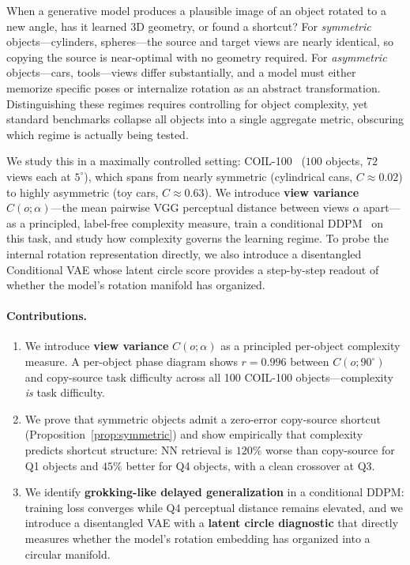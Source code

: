 \documentclass[11pt]{article}
\begin{document}
When a generative model produces a plausible image of an object rotated to a
new angle, has it learned 3D geometry, or found a shortcut?  For
\emph{symmetric} objects---cylinders, spheres---the source and target views are
nearly identical, so copying the source is near-optimal with no geometry
required.  For \emph{asymmetric} objects---cars, tools---views differ
substantially, and a model must either memorize specific poses or internalize
rotation as an abstract transformation.  Distinguishing these regimes requires
controlling for object complexity, yet standard benchmarks collapse all objects
into a single aggregate metric, obscuring which regime is actually being tested.

We study this in a maximally controlled setting: COIL-100~\cite{nene1996coil}
($100$ objects, $72$ views each at $5^{\circ}$), which spans from nearly
symmetric (cylindrical cans, $C \approx 0.02$) to highly asymmetric (toy cars,
$C \approx 0.63$).  We introduce \textbf{view variance} $C(o;\alpha)$---the
mean pairwise VGG perceptual distance between views $\alpha$ apart---as a
principled, label-free complexity measure, train a conditional
DDPM~\cite{ho2020ddpm} on this task, and study how complexity governs the
learning regime.  To probe the internal rotation representation directly, we
also introduce a disentangled Conditional VAE whose latent circle score
provides a step-by-step readout of whether the model's rotation manifold has
organized.

\paragraph{Contributions.}
\begin{enumerate}[label=(\arabic*),nosep,topsep=2pt]
  \item We introduce \textbf{view variance} $C(o;\alpha)$ as a principled
    per-object complexity measure.  A per-object phase diagram shows
    $r = 0.996$ between $C(o;90^{\circ})$ and copy-source task difficulty
    across all 100 COIL-100 objects---complexity \emph{is} task difficulty.
  \item We prove that symmetric objects admit a zero-error copy-source shortcut
    (Proposition~\ref{prop:symmetric}) and show empirically that complexity
    predicts shortcut structure: NN retrieval is $120\%$ worse than copy-source
    for Q1 objects and $45\%$ better for Q4 objects, with a clean crossover at Q3.
  \item We identify \textbf{grokking-like delayed generalization} in a
    conditional DDPM: training loss converges while Q4 perceptual distance
    remains elevated, and we introduce a disentangled VAE with a
    \textbf{latent circle diagnostic} that directly measures whether the model's
    rotation embedding has organized into a circular manifold.
\end{enumerate}
\end{document}
